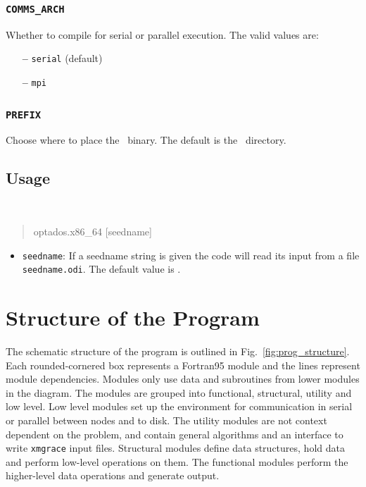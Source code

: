 \documentclass[a4paper,11pt,twoside]{book}
\begin{document}
{\subsection[comms_arch]{\tt COMMS\_ARCH}

Whether to compile for serial or parallel execution. The valid values are:
\begin{itemize}
\item[{\bf --}]  \verb#serial# (default) 
\item[{\bf --}]  \verb#mpi# 
\end{itemize}

\subsection[bin_dir]{\tt PREFIX}
Choose where to place the \optados\ binary. The default is the \optados\ directory.


\section{Usage}
{\tt
\begin{quote}
optados.x86\_64  [seedname]
\end{quote} }
\begin{itemize}
\item{  {\tt seedname}: If a seedname string is given the code will read its input from a file {\tt seedname.odi}. The default value is \castep.}
\end{itemize}


\chapter{Structure of the Program} \label{sec:structure}
The schematic structure of the program is outlined in Fig.~\ref{fig:prog_structure}. 
%
Each rounded-cornered box represents a Fortran95 module and the lines represent module dependencies. 
%
Modules only use data and subroutines from lower modules in the diagram. 
%
The modules are grouped into functional, structural, utility and low level.
%
Low level modules set up the environment for communication in serial or parallel between nodes and to disk. 
%
The utility modules are not context dependent on the problem, and contain general algorithms and an interface to write \texttt{xmgrace} input files.
%
Structural modules define data structures, hold data and perform low-level operations on them.
%
The functional modules perform the higher-level data operations and generate output.

}
\end{document}
